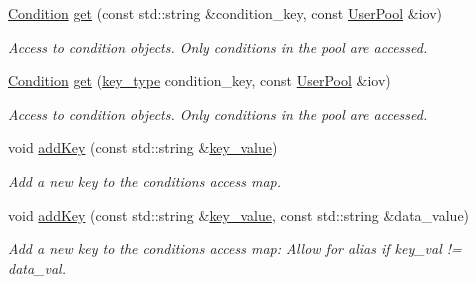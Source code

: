 \begin{DoxyCompactItemize}
\hyperlink{class_d_d4hep_1_1_conditions_1_1_condition}{Condition} \hyperlink{class_d_d4hep_1_1_conditions_1_1_interna_1_1_condition_container_a999f00f1cf10e88559f434210f6a6672}{get} (const std::string \&condition\_\-key, const \hyperlink{class_d_d4hep_1_1_conditions_1_1_user_pool}{UserPool} \&iov)
\begin{DoxyCompactList}\small\item\em Access to condition objects. Only conditions in the pool are accessed. \item\end{DoxyCompactList}\item 
\hyperlink{class_d_d4hep_1_1_conditions_1_1_condition}{Condition} \hyperlink{class_d_d4hep_1_1_conditions_1_1_interna_1_1_condition_container_a90e9c820b464a25d242823b7a0786a6a}{get} (\hyperlink{class_d_d4hep_1_1_conditions_1_1_interna_1_1_condition_container_a7a4545b4b0536565feb7346bd97c63fa}{key\_\-type} condition\_\-key, const \hyperlink{class_d_d4hep_1_1_conditions_1_1_user_pool}{UserPool} \&iov)
\begin{DoxyCompactList}\small\item\em Access to condition objects. Only conditions in the pool are accessed. \item\end{DoxyCompactList}\item 
void \hyperlink{class_d_d4hep_1_1_conditions_1_1_interna_1_1_condition_container_a74e97e0b749c515d2632ccc9bc079630}{addKey} (const std::string \&\hyperlink{class_d_d4hep_1_1_conditions_1_1_interna_1_1_condition_container_a2a8452e68d48eb94553607e7d7ae13f6}{key\_\-value})
\begin{DoxyCompactList}\small\item\em Add a new key to the conditions access map. \item\end{DoxyCompactList}\item 
void \hyperlink{class_d_d4hep_1_1_conditions_1_1_interna_1_1_condition_container_a04b12ce7b23723203334b6844306d079}{addKey} (const std::string \&\hyperlink{class_d_d4hep_1_1_conditions_1_1_interna_1_1_condition_container_a2a8452e68d48eb94553607e7d7ae13f6}{key\_\-value}, const std::string \&data\_\-value)
\begin{DoxyCompactList}\small\item\em Add a new key to the conditions access map: Allow for alias if key\_\-val != data\_\-val. \item\end{DoxyCompactList}\end{DoxyCompactItemize}
